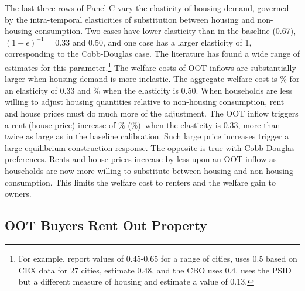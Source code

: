 \documentclass[letterpaper,12pt,dvipsnames,usenames]{article}
\theoremstyle{definition}
\begin{document}
\begin{spacing}{1.25}
{The last three rows of Panel C vary the elasticity of housing demand, governed by the intra-temporal elasticities of substitution between housing and non-housing consumption. Two cases have lower elasticity than in the baseline (0.67), $(1-\epsilon)^{-1}= 0.33$ and 0.50, and one case has a larger elasticity of 1, corresponding to the Cobb-Douglas case. The literature has found a wide range of estimates for this parameter.\footnote{For example, \cite{hanushek-quigley:80} report values of 0.45-0.65 for a range of cities, \cite{stokey:09} uses 0.5 based on CEX data for 27 cities, \cite{LLYY} estimate 0.48, and the CBO uses 0.4. \cite{flavin2008model} uses the PSID but a different measure of housing and estimate a value of 0.13.} The welfare costs of OOT inflows are substantially larger when housing demand is more inelastic. The aggregate welfare cost is \% for an elasticity of 0.33 and \% when the elasticity is 0.50. When households are less willing to adjust housing quantities relative to non-housing consumption, rent and house prices must do much more of the adjustment. The OOT inflow triggers a rent (house price) increase of \% (\%)\ when the elasticity is 0.33, more than twice as large as in the baseline calibration. Such large price increases trigger a large equilibrium construction response. The opposite is true with Cobb-Douglas preferences. Rents and house prices increase by less upon an OOT inflow as households are now more willing to substitute between housing and non-housing consumption. This limits the welfare cost to renters and the welfare gain to owners.


\subsection{OOT Buyers Rent Out Property}

}
\end{spacing}
\end{document}
